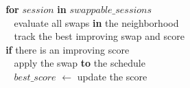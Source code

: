 $~~~~~~~~~~~~${\bf for} $\textit{session}$ {\bf in} $\textit{swappable\_sessions}$\\
$~~~~~~~~~~~~~~~~$evaluate all swaps {\bf in} the neighborhood\\
$~~~~~~~~~~~~~~~~$track the best improving swap and score\\
$~~~~~~~~~~~~${\bf if} there is an improving score\\
$~~~~~~~~~~~~~~~~$apply the swap {\bf to} the schedule\\
$~~~~~~~~~~~~~~~~$$\textit{best\_score}$ $\leftarrow$ update the score\\